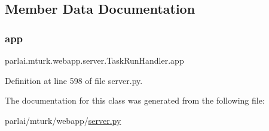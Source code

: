 \subsection{Member Data Documentation}
\mbox{\label{classparlai_1_1mturk_1_1webapp_1_1server_1_1TaskRunHandler_ae9e57d3ffed2fe707e9b1b041e65c2b7}} 
\subsubsection{\texorpdfstring{app}{app}}
{\footnotesize\ttfamily parlai.\+mturk.\+webapp.\+server.\+Task\+Run\+Handler.\+app}



Definition at line 598 of file server.\+py.



The documentation for this class was generated from the following file\+:\begin{DoxyCompactItemize}
\item 
parlai/mturk/webapp/\hyperlink{server_8py}{server.\+py}\end{DoxyCompactItemize}

